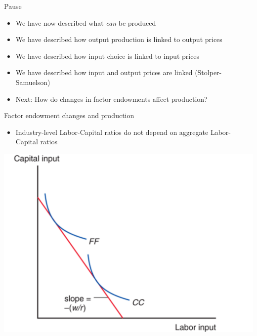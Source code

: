 \documentclass[ignorenonframetext,]{beamer}
\begin{document}
\begin{frame}{Pause}

    \begin{itemize}
        \item We have now described what \emph{can} be produced
        \item We have described how output production is linked to output prices
        \item We have described how input choice is linked to input prices
        \item We have described how input and output prices are linked (Stolper-Samuelson)
        \item Next: How do changes in factor endowments affect production?
    \end{itemize}

\end{frame}

\begin{frame}{Factor endowment changes and production}

    \begin{itemize}
        \item Industry-level Labor-Capital ratios do not depend on aggregate Labor-Capital ratios 
    \end{itemize}
    \includegraphics[scale=0.2]{two_factor_choice.png}

\end{frame}
\end{document}
